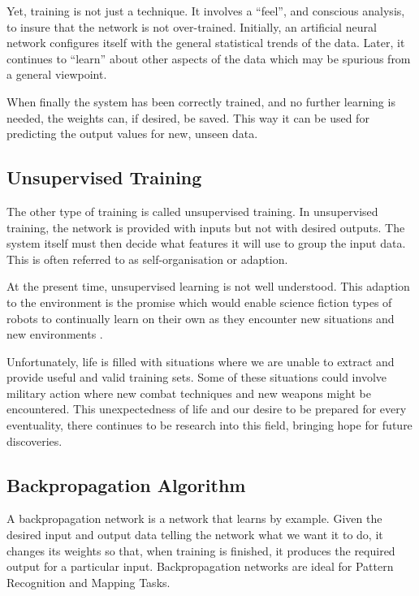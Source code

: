 Yet, training is not just a technique. It involves a ``feel'', and conscious analysis, to insure that the network is not over-trained. Initially, an artificial neural network configures itself with the general statistical trends of the data. Later, it continues to ``learn'' about other aspects of the data which may be spurious from a general viewpoint.

When finally the system has been correctly trained, and no further learning is needed, the weights can, if desired, be saved. This way it can be used for predicting the output values for new, unseen data.

\vspace{10pt}

\subsection*{Unsupervised Training}

The other type of training is called unsupervised training. In unsupervised training, the network is provided with inputs but not with desired outputs. The system itself must then decide what features it will use to group the input data. This is often referred to as self-organisation or adaption.

At the present time, unsupervised learning is not well understood. This adaption to the environment is the promise which would enable science fiction types of robots to continually learn on their own as they encounter new situations and new environments \cite{unsupervised}.

Unfortunately, life is filled with situations where we are unable to extract and provide useful and valid training sets. Some of these situations could involve military action where new combat techniques and new weapons might be encountered. This unexpectedness of life and our desire to be prepared for every eventuality, there continues to be research into this field, bringing hope for future discoveries.

\vspace{10pt}

\subsection{Backpropagation Algorithm}

A backpropagation network is a network that learns by example. Given the desired input and output data telling the network what we want it to do, it changes its weights so that, when training is finished, it produces the required output for a particular input. Backpropagation networks are ideal for Pattern Recognition and Mapping Tasks.


